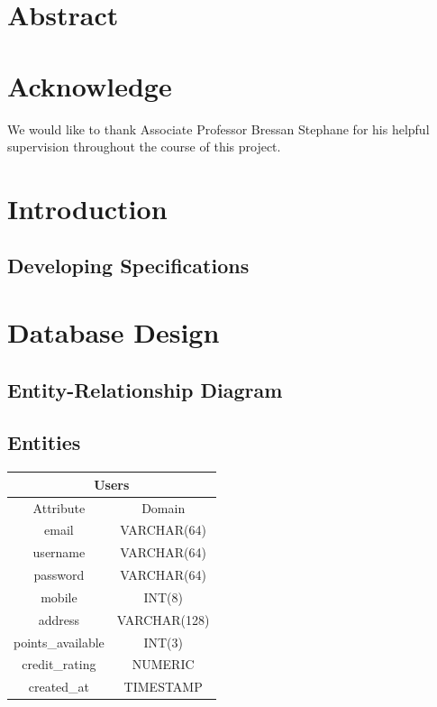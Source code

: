 \section*{Abstract}
\newpage

\section*{Acknowledge}
We would like to thank Associate Professor Bressan Stephane for his helpful supervision
throughout the course of this project.
\newpage
\tableofcontents
\newpage

\section{Introduction}

\subsection{Developing Specifications}
\newpage

\section{Database Design}

\subsection{Entity-Relationship Diagram}
\newpage

\subsection{Entities}

\begin{center}
\begin{tabular}{|c|c|}
\multicolumn{2}{c}{Users}\\[2mm]
\hline
Attribute & Domain\\
\hline
email & VARCHAR(64)\\
username & VARCHAR(64) \\
password & VARCHAR(64) \\
mobile & INT(8) \\
address & VARCHAR(128) \\
points\_available & INT(3) \\
credit\_rating & NUMERIC \\
created\_at & TIMESTAMP \\
\hline
\end{tabular}
\end{center}



